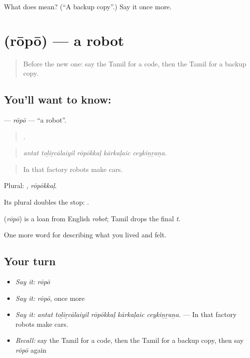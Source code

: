 \begin{tcolorbox}[breakable,colback=teal!4,colframe=teal!35!black,title={Before you move on}]
What does  mean? (\textquotedblleft{}A backup copy\textquotedblright{}.) Say it once more.
\end{tcolorbox}
\section[\texorpdfstring{\ta{ரோபோ} (rōpō)}{ரோபோ (rōpō)}]{ (rōpō) — a robot}

\label{lesson:TA-C518-ropo}



\begin{quote}
Before the new one: say the Tamil for a code, then the Tamil for a backup copy.
\end{quote}

\subsection*{You'll want to know: }
\textbf{} — \emph{rōpō} — \textquotedblleft{}a robot\textquotedblright{}.

\begin{quote}
    .
\end{quote}

\begin{quote}
\emph{antat toḻiṟcālaiyil rōpōkkaḷ kārkaḷaic ceykiṉṟaṉa.}
\end{quote}

\begin{quote}
In that factory robots make cars.
\end{quote}

Plural: , \emph{rōpōkkaḷ}.

Its plural doubles the stop: .

\begin{cousinweb}
\textbf{} (\emph{rōpō}) is a loan from English \emph{robot}; Tamil drops the final \emph{t}.
\end{cousinweb}

\begin{grammarlens}[title={What you've built}]
One more word for describing what you lived and felt.
\end{grammarlens}

\subsection*{Your turn}
\begin{itemize}
\raggedright
  \item \emph{Say it:} \emph{rōpō}
  \item \emph{Say it:} \emph{rōpō}, once more
  \item \emph{Say it:} \emph{antat toḻiṟcālaiyil rōpōkkaḷ kārkaḷaic ceykiṉṟaṉa.} — In that factory robots make cars.
  \item \emph{Recall:} say the Tamil for a code, then the Tamil for a backup copy, then say \emph{rōpō} again
\end{itemize}

